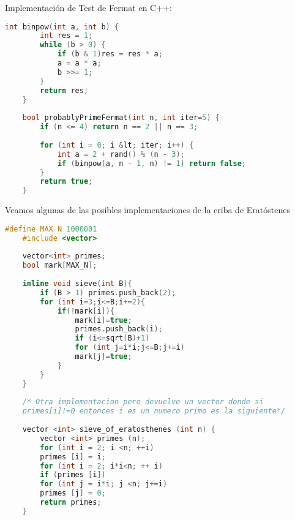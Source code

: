 Implementación de Test de Fermat en C++:

\begin{lstlisting}[language=C++]
	int binpow(int a, int b) {
		int res = 1;
		while (b > 0) {
			if (b & 1)res = res * a;
			a = a * a;
			b >>= 1;
		}
		return res;
	}
	
	bool probablyPrimeFermat(int n, int iter=5) {
		if (n <= 4) return n == 2 || n == 3;
		
		for (int i = 0; i &lt; iter; i++) {
			int a = 2 + rand() % (n - 3);
			if (binpow(a, n - 1, n) != 1) return false;
		}
		return true;
	} 
\end{lstlisting}

Veamos algunas de las posibles implementaciones de la criba de Eratóstenes

\begin{lstlisting}[language=C++]
	#define MAX_N 1000001
	#include <vector>
	
	vector<int> primes;
	bool mark[MAX_N];
	
	inline void sieve(int B){
		if (B > 1) primes.push_back(2);
		for (int i=3;i<=B;i+=2){
			if(!mark[i]){
				mark[i]=true;
				primes.push_back(i);
				if (i<=sqrt(B)+1)  
				for (int j=i*i;j<=B;j+=i)
				mark[j]=true;
			}
		}
	} 
	
	/* Otra implementacion pero devuelve un vector donde si 
	primes[i]!=0 entonces i es un numero primo es la siguiente*/
	
	vector <int> sieve_of_eratosthenes (int n) {
		vector <int> primes (n);
		for (int i = 2; i <n; ++i)
		primes [i] = i;
		for (int i = 2; i*i<n; ++ i)
		if (primes [i])
		for (int j = i*i; j <n; j+=i)
		primes [j] = 0;
		return primes;
	}
\end{lstlisting}


